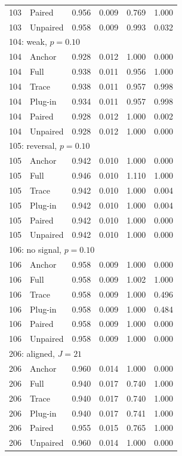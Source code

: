 \begin{longtable}{llrrrr}
103 & Paired & 0.956 & 0.009 & 0.769 & 1.000 \\
103 & Unpaired & 0.958 & 0.009 & 0.993 & 0.032 \\
\multicolumn{6}{l}{104: weak, $p=0.10$}\\
104 & Anchor & 0.928 & 0.012 & 1.000 & 0.000 \\
104 & Full & 0.938 & 0.011 & 0.956 & 1.000 \\
104 & Trace & 0.938 & 0.011 & 0.957 & 0.998 \\
104 & Plug-in & 0.934 & 0.011 & 0.957 & 0.998 \\
104 & Paired & 0.928 & 0.012 & 1.000 & 0.002 \\
104 & Unpaired & 0.928 & 0.012 & 1.000 & 0.000 \\
\multicolumn{6}{l}{105: reversal, $p=0.10$}\\
105 & Anchor & 0.942 & 0.010 & 1.000 & 0.000 \\
105 & Full & 0.946 & 0.010 & 1.110 & 1.000 \\
105 & Trace & 0.942 & 0.010 & 1.000 & 0.004 \\
105 & Plug-in & 0.942 & 0.010 & 1.000 & 0.004 \\
105 & Paired & 0.942 & 0.010 & 1.000 & 0.000 \\
105 & Unpaired & 0.942 & 0.010 & 1.000 & 0.000 \\
\multicolumn{6}{l}{106: no signal, $p=0.10$}\\
106 & Anchor & 0.958 & 0.009 & 1.000 & 0.000 \\
106 & Full & 0.958 & 0.009 & 1.002 & 1.000 \\
106 & Trace & 0.958 & 0.009 & 1.000 & 0.496 \\
106 & Plug-in & 0.958 & 0.009 & 1.000 & 0.484 \\
106 & Paired & 0.958 & 0.009 & 1.000 & 0.000 \\
106 & Unpaired & 0.958 & 0.009 & 1.000 & 0.000 \\
\multicolumn{6}{l}{206: aligned, $J=21$}\\
206 & Anchor & 0.960 & 0.014 & 1.000 & 0.000 \\
206 & Full & 0.940 & 0.017 & 0.740 & 1.000 \\
206 & Trace & 0.940 & 0.017 & 0.740 & 1.000 \\
206 & Plug-in & 0.940 & 0.017 & 0.741 & 1.000 \\
206 & Paired & 0.955 & 0.015 & 0.765 & 1.000 \\
206 & Unpaired & 0.960 & 0.014 & 1.000 & 0.000 \\

\end{longtable}
